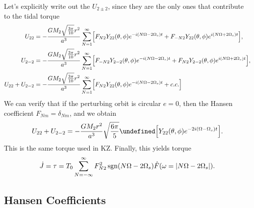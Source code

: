 \documentclass[11pt,
        usenames, %
        dvipsnames %
    ]{article}
\let\Re\undefined
\DeclareMathOperator{\Re}{Re}
\DeclareMathOperator{\sgn}{sgn}
\DeclarePairedDelimiter\abs{\lvert}{\rvert}
\DeclarePairedDelimiter\p{\lparen}{\rparen}
\DeclarePairedDelimiter\s{\lbrack}{\rbrack}
\begin{document}
Let's explicitly write out the $U_{2\pm 2}$, since they are the only ones that
contribute to the tidal torque
\begin{align}
    U_{22} &= -\frac{GM_2 \sqrt{\frac{3\pi}{10}}r^2}{a^3}
        \sum\limits_{N = 1}^\infty \s*{
            F_{N2}Y_{22}\p*{\theta, \phi}e^{-i\p*{N\Omega - 2\Omega_s}t}
            + F_{-N2}Y_{22}\p*{\theta, \phi}e^{i\p*{N\Omega + 2\Omega_s}t}},\\
    U_{2-2} &= -\frac{GM_2 \sqrt{\frac{3\pi}{10}} r^2}{a^3}
        \sum\limits_{N = 1}^\infty \s*{
            F_{-N2}Y_{2-2}\p*{\theta, \phi}e^{-i\p*{N\Omega - 2\Omega_s}t}
            + F_{N2}Y_{2-2}\p*{\theta, \phi}e^{i\p*{N\Omega + 2\Omega_s}t}},\\
    U_{22} + U_{2-2} &= -\frac{GM_2 \sqrt{\frac{3\pi}{10}} r^2}{a^3}
        \sum\limits_{N = 1}^\infty \s*{
            F_{N2}Y_{22}\p*{\theta, \phi}e^{-i\p*{N\Omega - 2\Omega_s}t}
            + c.c.}
\end{align}
We can verify that if the perturbing orbit is circular $e = 0$, then the Hansen
coefficient $F_{Nm} = \delta_{Nm}$, and we obtain
\begin{equation}
    U_{22} + U_{2-2} = -\frac{GM_2r^2}{a^3}\sqrt{\frac{6\pi}{5}}
        \Re \s*{Y_{22}\p*{\theta, \phi}e^{-2i\p*{\Omega - \Omega_s}t}}.
\end{equation}
This is the same torque used in KZ\@. Finally, this yields torque
\begin{equation}
    \dot{J} = \tau = T_0 \sum\limits_{N = -\infty}^\infty
        F_{N2}^2 \sgn\p*{N\Omega - 2\Omega_s} \hat{F}
            \p*{\omega = \abs*{N\Omega - 2\Omega_s}}.
\end{equation}

\subsection{Hansen Coefficients}
\end{document}
